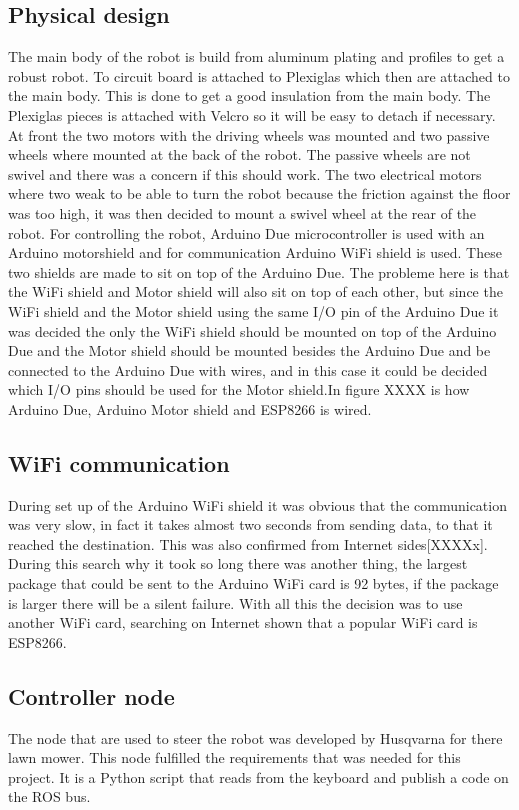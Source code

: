 \documentclass[11pt]{article}
\begin{document}
\subsection{Physical design}
The main body of the robot is build from aluminum plating and profiles to get a robust robot. To circuit board is attached to Plexiglas which then are attached to the main body. This is done to get a good insulation from the main body. The Plexiglas pieces is attached with Velcro so it will be easy to detach if necessary. At front the two motors with the driving wheels was mounted and two passive wheels where mounted at the back of the robot. The passive wheels are not swivel and there was a concern if this should work. The two electrical motors where two weak to be able to turn the robot because the friction against the floor was too high, it was then decided to mount a swivel wheel at the rear of the robot. 
For controlling the robot, Arduino Due microcontroller is used with an Arduino motorshield and for communication Arduino WiFi shield is used. These two shields are made to sit on top of the Arduino Due. The probleme here is that the WiFi shield and Motor shield will also sit on top of each other, but since the WiFi shield and the Motor shield using the same I/O pin of the Arduino Due it was decided the only the WiFi shield should be mounted on top of the Arduino Due and the Motor shield should be mounted besides the Arduino Due and be connected to the Arduino Due with wires, and in this case it could be decided which I/O pins should be used for the Motor shield.In figure XXXX is how Arduino Due, Arduino Motor shield and ESP8266 is wired.

\subsection{WiFi communication}
During set up of the Arduino WiFi shield it was obvious that the communication was very slow, in fact it takes almost two seconds from sending data, to that it reached the destination. This was also confirmed from Internet sides[XXXXx]. During this search why it took so long there was another thing, the largest package that could be sent to the Arduino WiFi card is 92 bytes, if the package is larger there will be a silent failure. With all this the decision was to use another WiFi card, searching on Internet shown that a popular WiFi card is ESP8266.

\subsection{Controller node}
The node that are used to steer the robot was developed by Husqvarna for there lawn mower. This node fulfilled the requirements that was needed for this project. It is a Python script that reads from the keyboard and publish a code on the ROS bus.
\label{subsec:cn}
\end{document}
